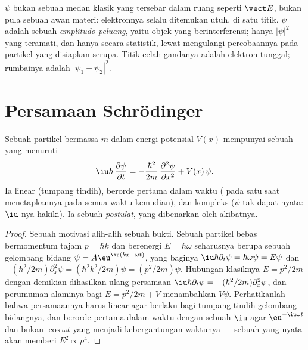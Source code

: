 \begin{remark}\label{rem:b2:schrodinger-wave-functions:not}
$\psi$ bukan sebuah medan klasik yang tersebar dalam ruang seperti $\vect E$, bukan pula
sebuah awan materi: elektronnya selalu ditemukan utuh, di satu titik.
$\psi$ adalah sebuah \emph{amplitudo peluang}, yaitu objek yang
berinterferensi; hanya $|\psi|^2$ yang teramati, dan hanya secara statistik, lewat
mengulangi percobaannya pada partikel yang disiapkan serupa. Titik
celah gandanya adalah elektron tunggal; rumbainya adalah $|\psi_1 +
\psi_2|^2$.
\end{remark}

\section{Persamaan Schrödinger}

\begin{theorem}\label{thm:b2:schrodinger-wave-functions:equation}
Sebuah partikel bermassa $m$ dalam energi potensial $V(x)$ mempunyai sebuah  yang menuruti
\[
\iu\hbar\,\frac{\partial\psi}{\partial t} = -\frac{\hbar^2}{2m}\,\frac{\partial^2\psi}{\partial x^2} + V(x)\,\psi .
\]
Ia linear (tumpang tindih), berorde pertama dalam waktu (
pada satu saat menetapkannya pada semua waktu kemudian), dan kompleks ($\psi$
tak dapat nyata: $\iu$-nya hakiki). Ia sebuah \emph{postulat},
yang dibenarkan oleh akibatnya.
\end{theorem}

\begin{proof}
Sebuah motivasi alih-alih sebuah bukti. Sebuah partikel bebas bermomentum tajam
$p = \hbar k$ dan berenergi $E = \hbar\omega$ seharusnya berupa sebuah gelombang bidang $\psi =
A\eu^{\iu(kx - \omega t)}$, yang baginya $\iu\hbar\partial_t\psi = \hbar\omega\psi =
E\psi$ dan $-(\hbar^2/2m)\partial_x^2\psi = (\hbar^2k^2/2m)\psi = (p^2/2m)\psi$.
Hubungan klasiknya $E = p^2/2m$ dengan demikian dihasilkan ulang persamaan
$\iu\hbar\partial_t\psi = -(\hbar^2/2m)\partial_x^2\psi$, dan perumuman alaminya
bagi $E = p^2/2m + V$ menambahkan $V\psi$. Perhatikanlah bahwa
persamaannya harus linear agar berlaku bagi tumpang tindih gelombang bidangnya, dan
berorde pertama dalam waktu dengan sebuah $\iu$ agar $\eu^{-\iu\omega t}$ dan bukan
$\cos\omega t$ yang menjadi kebergantungan waktunya --- sebuah  yang nyata akan
memberi $E^2 \propto p^4$.
\end{proof}

